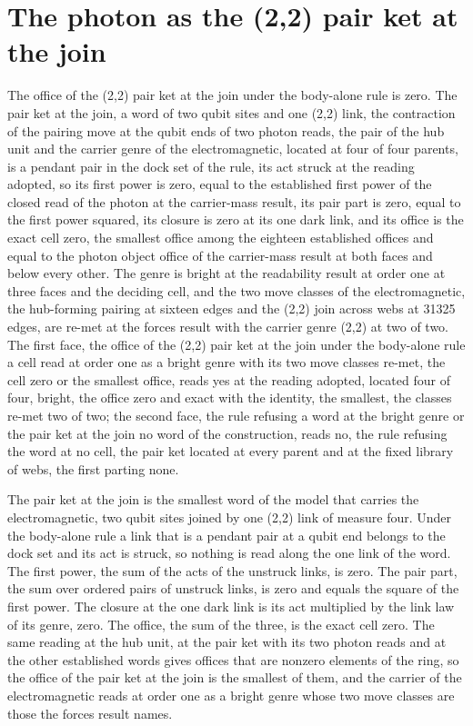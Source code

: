 \section{The photon as the (2,2) pair ket at the join}\label{mod:V-8-D539949-phpk-t1}
\begin{chtheorem}\label{box:V-8-D539949-phpk-t1:1}
The office of the (2,2) pair ket at the join under the body-alone rule is zero. The pair ket at the join, a word of two qubit sites and one (2,2) link, the contraction of the pairing move at the qubit ends of two photon reads, the pair of the hub unit and the carrier genre of the electromagnetic, located at four of four parents, is a pendant pair in the dock set of the rule, its act struck at the reading adopted, so its first power is zero, equal to the established first power of the closed read of the photon at the carrier-mass result, its pair part is zero, equal to the first power squared, its closure is zero at its one dark link, and its office is the exact cell zero, the smallest office among the eighteen established offices and equal to the photon object office of the carrier-mass result at both faces and below every other. The genre is bright at the readability result at order one at three faces and the deciding cell, and the two move classes of the electromagnetic, the hub-forming pairing at sixteen edges and the (2,2) join across webs at 31325 edges, are re-met at the forces result with the carrier genre (2,2) at two of two.
The first face, the office of the (2,2) pair ket at the join under the body-alone rule a cell read at order one as a bright genre with its two move classes re-met, the cell zero or the smallest office, reads yes at the reading adopted, located four of four, bright, the office zero and exact with the identity, the smallest, the classes re-met two of two; the second face, the rule refusing a word at the bright genre or the pair ket at the join no word of the construction, reads no, the rule refusing the word at no cell, the pair ket located at every parent and at the fixed library of webs, the first parting none.
\end{chtheorem}
The pair ket at the join is the smallest word of the model that carries the electromagnetic, two qubit sites joined by one (2,2) link of measure four. Under the body-alone rule a link that is a pendant pair at a qubit end belongs to the dock set and its act is struck, so nothing is read along the one link of the word. The first power, the sum of the acts of the unstruck links, is zero. The pair part, the sum over ordered pairs of unstruck links, is zero and equals the square of the first power. The closure at the one dark link is its act multiplied by the link law of its genre, zero. The office, the sum of the three, is the exact cell zero. The same reading at the hub unit, at the pair ket with its two photon reads and at the other established words gives offices that are nonzero elements of the ring, so the office of the pair ket at the join is the smallest of them, and the carrier of the electromagnetic reads at order one as a bright genre whose two move classes are those the forces result names.
